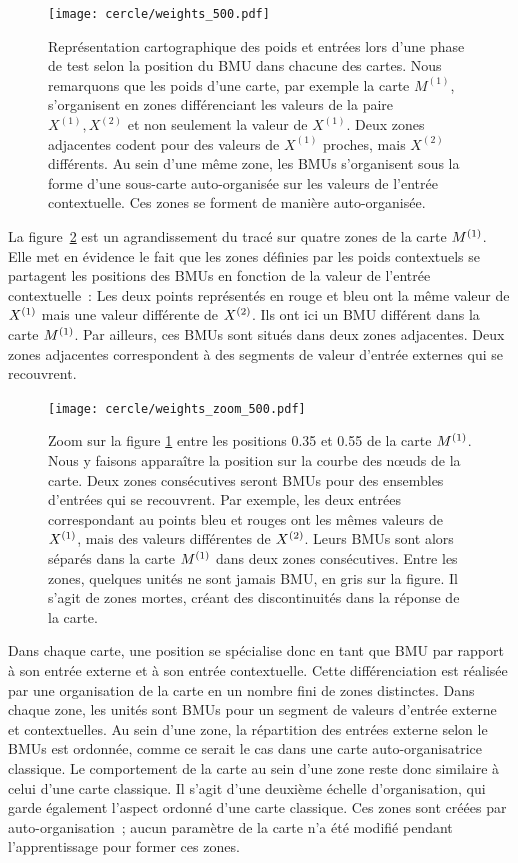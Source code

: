 \documentclass[../main]{subfiles}
\begin{document}
\begin{figure}[ht]
	\centering\texttt{[image: cercle/weights\_500.pdf]}
	\caption{Représentation cartographique des poids et entrées lors d'une phase de test selon la position du BMU dans chacune des cartes. Nous remarquons que les poids d'une carte, par exemple la carte $M^{(1)}$, s'organisent en zones différenciant les valeurs de la paire $X^{(1)}, X^{(2)}$ et non seulement la valeur de $X^{(1)}$. 
	Deux zones adjacentes codent pour des valeurs de $X^{(1)}$ proches, mais $X^{(2)}$ différents. 
	Au sein d'une même zone, les BMUs s'organisent sous la forme d'une sous-carte auto-organisée sur les valeurs de l'entrée contextuelle. Ces zones se forment de manière auto-organisée. \label{fig:w}}
\end{figure}

La figure~\ref{fig:w_zoom} est un agrandissement du tracé sur quatre zones de la carte $M^{({1})}$.
Elle met en évidence le fait que les zones définies par les poids contextuels se partagent les positions des BMUs en fonction de la valeur de l'entrée contextuelle~:
Les deux points représentés en rouge et bleu ont la même valeur de $X^{({1})}$ mais une valeur différente de $X^{({2})}$. 
Ils ont ici un BMU différent dans la carte $M^{({1})}$. Par ailleurs, ces BMUs sont situés dans deux zones adjacentes.
Deux zones adjacentes correspondent à des segments de valeur d'entrée externes qui se recouvrent.

\begin{figure}[ht]
	\centering\texttt{[image: cercle/weights\_zoom\_500.pdf]}
   \caption{Zoom sur la figure \ref{fig:w} entre les positions 0.35 et 0.55 de la carte $M^{({1})}$. 
   Nous y faisons apparaître la position sur la courbe des n\oe{}uds de la carte.
   Deux zones consécutives seront BMUs pour des ensembles d'entrées qui se recouvrent. Par exemple, les deux entrées correspondant au points bleu et rouges ont les mêmes valeurs de $X^{({1})}$, mais des valeurs différentes de $X^{({2})}$. Leurs BMUs sont alors séparés dans la carte $M^{({1})}$ dans deux zones consécutives.
   Entre les zones, quelques unités ne sont jamais BMU, en gris sur la figure. Il s'agit de zones mortes, créant des discontinuités dans la réponse de la carte.
   \label{fig:w_zoom}}
\end{figure}

Dans chaque carte, une position se spécialise donc en tant que BMU par rapport à son entrée externe et à son entrée contextuelle.
Cette différenciation est réalisée par une organisation de la carte en un nombre fini de zones distinctes. Dans chaque zone, les unités sont BMUs pour un segment de valeurs d'entrée externe et contextuelles. 
Au sein d'une zone, la répartition des entrées externe selon le BMUs est ordonnée, comme ce serait le cas dans une carte auto-organisatrice classique. Le comportement de la carte au sein d'une zone reste donc similaire à celui d'une carte classique.
Il s'agit d'une deuxième échelle d'organisation, qui garde également l'aspect ordonné d'une carte classique. 
Ces zones sont créées par auto-organisation~; aucun paramètre de la carte n'a été modifié pendant l'apprentissage pour former ces zones.
\end{document}
